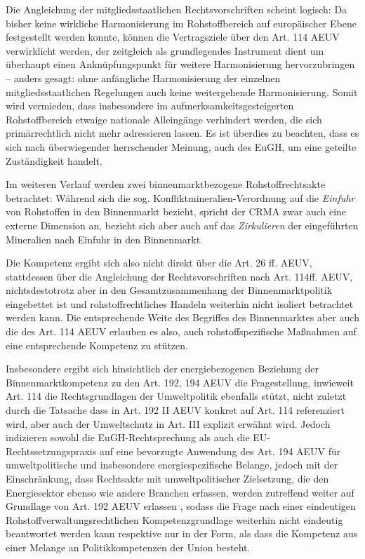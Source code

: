 \documentclass[12pt,a4paper,oneside]{book} %
\begin{document}
Die Angleichung der mitgliedsstaatlichen Rechtsvorschriften scheint logisch: Da bisher keine wirkliche Harmonisierung im Rohstoffbereich auf europäischer Ebene festgestellt werden konnte, können die Vertragsziele über den Art. 114 AEUV verwirklicht werden, der zeitgleich als grundlegendes Instrument dient um überhaupt einen Anknüpfungspunkt für weitere Harmonisierung hervorzubringen -- anders gesagt: ohne anfängliche Harmonisierung der einzelnen mitgliedsstaatlichen Regelungen auch keine weitergehende Harmonisierung. Somit wird vermieden, dass insbesondere im aufmerksamkeitsgesteigerten Rohstoffbereich etwaige nationale Alleingänge verhindert werden, die sich primärrechtlich nicht mehr adressieren lassen.\autocite{Streinz, EUV/AEUV Art. 114, Rn. 6} Es ist überdies zu beachten, dass es sich nach überwiegender herrschender Meinung, auch des EuGH, um eine geteilte Zuständigkeit handelt.\autocites{Streinz, EUV/AEUV Art. 114, Rn. 7}{Calliess/Ruffert, EUV/AEUV, Art. 114, Rn. 8}

Im weiteren Verlauf werden zwei binnenmarktbezogene Rohstoffrechtsakte betrachtet: Während sich die sog. Konfliktmineralien-Verordnung auf die \textit{Einfuhr} von Rohstoffen in den Binnenmarkt bezieht, spricht der CRMA zwar auch eine externe Dimension an, bezieht sich aber auch auf das \textit{Zirkulieren} der eingeführten Mineralien nach Einfuhr in den Binnenmarkt.

Die Kompetenz ergibt sich also nicht direkt über die Art. 26 ff. AEUV, stattdessen über die Angleichung der Rechtsvorschriften nach Art. 114ff. AEUV, nichtsdestotrotz aber in den Gesamtzusammenhang der Binnenmarktpolitik eingebettet ist und rohstoffrechtliches Handeln weiterhin nicht isoliert betrachtet werden kann. Die entsprechende Weite des Begriffes des Binnenmarktes aber auch die des Art. 114 AEUV erlauben es also, auch rohstoffspezifische Maßnahmen auf eine entsprechende Kompetenz zu stützen.

Insbesondere ergibt sich hinsichtlich der energiebezogenen Beziehung der Binnenmarktkompetenz zu den Art. 192, 194 AEUV die Fragestellung, inwieweit Art. 114 die Rechtsgrundlagen der Umweltpolitik ebenfalls stützt, nicht zuletzt durch die Tatsache dass in Art. 192 II AEUV konkret auf Art. 114 referenziert wird, aber auch der Umweltschutz in Art. III explizit erwähnt wird.\autocite[siehe insbesondere hierzu Gundel §m Rn 28f]{dauses_handbuch_2024} Jedoch indizieren sowohl die EuGH-Rechtsprechung als auch die EU-Rechtssetzungspraxis auf eine bevorzugte Anwendung des Art. 194 AEUV für umweltpolitische und insbesondere energiespezifische Belange, jedoch mit der Einschränkung, dass \glqq Rechtsakte mit umweltpolitischer Zielsetzung, die den Energiesektor ebenso wie andere Branchen erfassen, werden zutreffend weiter auf Grundlage von Art. 192 AEUV erlassen \grqq\autocite[Gundel §m Rn 29]{dauses_handbuch_2024}, sodass die Frage nach einer eindeutigen Rohstoffverwaltungsrechtlichen Kompetenzgrundlage weiterhin nicht eindeutig beantwortet werden kann respektive nur in der Form, als dass die Kompetenz aus einer Melange an Politikkompetenzen der Union besteht.
	
\end{document}
